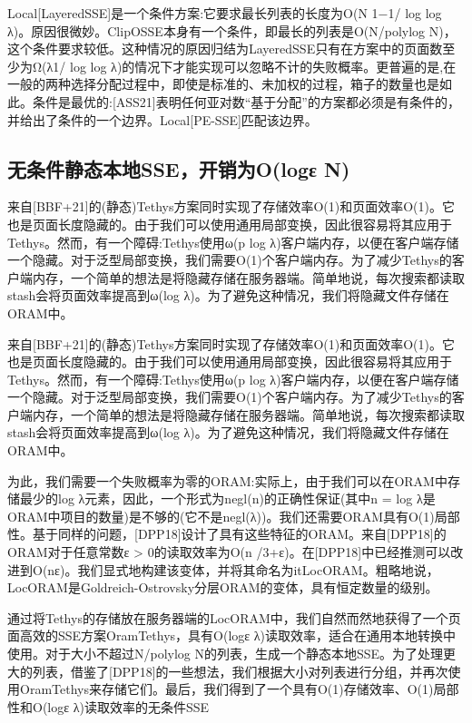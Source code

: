 \documentclass[UTF8]{article}
\begin{document}
Local[LayeredSSE]是一个条件方案:它要求最长列表的长度为O(N 1−1/ log log λ)。原因很微妙。ClipOSSE本身有一个条件，即最长的列表是O(N/polylog N)，这个条件要求较低。这种情况的原因归结为LayeredSSE只有在方案中的页面数至少为Ω(λ1/ log log λ)的情况下才能实现可以忽略不计的失败概率。更普遍的是,在一般的两种选择分配过程中，即使是标准的、未加权的过程，箱子的数量也是如此。条件是最优的:[ASS21]表明任何亚对数“基于分配”的方案都必须是有条件的，并给出了条件的一个边界。Local[PE-SSE]匹配该边界。

\subsection{无条件静态本地SSE，开销为O(logε N)}
来自[BBF+21]的(静态)Tethys方案同时实现了存储效率O(1)和页面效率O(1)。它也是页面长度隐藏的。由于我们可以使用通用局部变换，因此很容易将其应用于Tethys。然而，有一个障碍:Tethys使用ω(p log λ)客户端内存，以便在客户端存储一个隐藏。对于泛型局部变换，我们需要O(1)个客户端内存。为了减少Tethys的客户端内存，一个简单的想法是将隐藏存储在服务器端。简单地说，每次搜索都读取stash会将页面效率提高到ω(log λ)。为了避免这种情况，我们将隐藏文件存储在ORAM中。

来自[BBF+21]的(静态)Tethys方案同时实现了存储效率O(1)和页面效率O(1)。它也是页面长度隐藏的。由于我们可以使用通用局部变换，因此很容易将其应用于Tethys。然而，有一个障碍:Tethys使用ω(p log λ)客户端内存，以便在客户端存储一个隐藏。对于泛型局部变换，我们需要O(1)个客户端内存。为了减少Tethys的客户端内存，一个简单的想法是将隐藏存储在服务器端。简单地说，每次搜索都读取stash会将页面效率提高到ω(log λ)。为了避免这种情况，我们将隐藏文件存储在ORAM中。

为此，我们需要一个失败概率为零的ORAM:实际上，由于我们可以在ORAM中存储最少的log λ元素，因此，一个形式为negl(n)的正确性保证(其中n = log λ是ORAM中项目的数量)是不够的(它不是negl(λ))。我们还需要ORAM具有O(1)局部性。基于同样的问题，[DPP18]设计了具有这些特征的ORAM。来自[DPP18]的ORAM对于任意常数ε > 0的读取效率为O(n /3+ε)。在[DPP18]中已经推测可以改进到O(nε)。我们显式地构建该变体，并将其命名为itLocORAM。粗略地说，LocORAM是Goldreich-Ostrovsky分层ORAM的变体，具有恒定数量的级别。

通过将Tethys的存储放在服务器端的LocORAM中，我们自然而然地获得了一个页面高效的SSE方案OramTethys，具有O(logε λ)读取效率，适合在通用本地转换中使用。对于大小不超过N/polylog N的列表，生成一个静态本地SSE。为了处理更大的列表，借鉴了[DPP18]的一些想法，我们根据大小对列表进行分组，并再次使用OramTethys来存储它们。最后，我们得到了一个具有O(1)存储效率、O(1)局部性和O(logε λ)读取效率的无条件SSE
\end{document}
